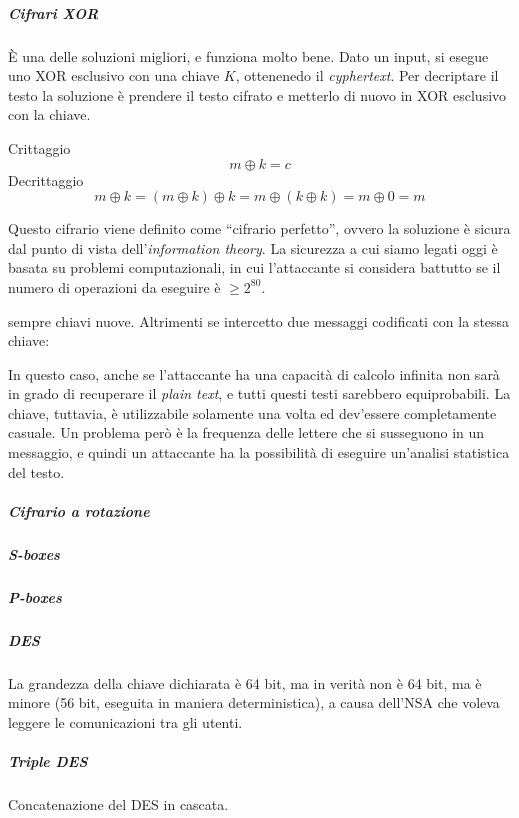 \subparagraph{Cifrari XOR}

È una delle soluzioni migliori, e funziona molto bene. Dato un input, si esegue 
uno XOR esclusivo con una chiave $K$, ottenenedo il \textit{cyphertext}. Per 
decriptare il testo la soluzione è prendere il testo cifrato e metterlo di nuovo 
in XOR esclusivo con la chiave.

Crittaggio
$$
m \oplus k = c
$$
\indent Decrittaggio
$$
m \oplus k = (m \oplus k) \oplus k = m \oplus (k \oplus k) = m \oplus 0 = m
$$

Questo cifrario viene definito come ``cifrario perfetto'', ovvero la soluzione è 
sicura dal punto di vista dell'\textit{information theory}. La sicurezza a cui 
siamo legati oggi è basata su problemi computazionali, in cui l'attaccante si 
considera battutto se il numero di operazioni da eseguire è $\ge 2^{80}$.

sempre chiavi nuove. Altrimenti se intercetto due messaggi codificati con la 
stessa chiave:

 In questo caso, anche se l'attaccante ha 
una capacità di calcolo infinita non sarà in grado di recuperare il 
\textit{plain text}, e tutti questi testi sarebbero equiprobabili. La chiave, 
tuttavia, è utilizzabile solamente una volta ed dev'essere completamente 
casuale.
Un problema però è la frequenza delle lettere che si susseguono in un messaggio, 
e quindi un attaccante ha la possibilità di eseguire un'analisi statistica del 
testo.

\subparagraph{Cifrario a rotazione}


\subparagraph{S-boxes}


\subparagraph{P-boxes}


\subparagraph{DES}


La grandezza della chiave dichiarata è 64 bit, ma in verità non è 64 bit, ma è 
minore (56 bit, eseguita in maniera deterministica), a causa dell'NSA che voleva 
leggere le comunicazioni tra gli utenti.

\subparagraph{Triple DES}

Concatenazione del DES in cascata.

